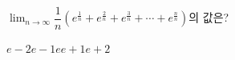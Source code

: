 \hspace*{2mm}\begin{minipage}[t]{\dimexpr\linewidth-2mm\relax}\vspace{0pt}
$\displaystyle\lim_{n\to\infty}\dfrac{1}{n}\left(e^{\frac{1}{n}}+e^{\frac{2}{n}}+e^{\frac{3}{n}}+\cdots+e^{\frac{n}{n}}\right)$의 값은?
\begin{choices32}{$e-2$}{$e-1$}{$e$}{$e+1$}{$e+2$}\end{choices32}\end{minipage}
